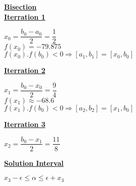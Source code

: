 \newpage
\textbf{\underline{Bisection}}\\[0.15cm]
\textbf{\underline{Iterration 1}}
\begin{center}
    \(x_0 = \dfrac{b_0-a_0}{2} = \dfrac{1}{2}\)\\[0.4cm]
    \(f(x_0) = -79.875\)\\[0.4cm]
    \(f(x_0) . f(b_0) < 0 \Rightarrow [a_1,b_1] = [x_0,b_0]\)
\end{center}

\vspace{1cm}

\textbf{\underline{Iterration 2}}
\begin{center}
    \(x_1 = \dfrac{b_0-x_0}{2} = \dfrac{9}{4}\)\\[0.4cm]
    \(f(x_1) \approx -68.6\)\\[0.4cm]
    \(f(x_1) . f(b_0) < 0 \Rightarrow [a_2,b_2] = [x_1,b_0]\)
\end{center}

\vspace{1cm}

\textbf{\underline{Iterration 3}}
\begin{center}
    \(x_2 = \dfrac{b_0-x_1}{2} = \dfrac{11}{8}\)\\[0.4cm]
\end{center}

\vspace{1cm}

\textbf{\underline{Solution Interval}}
\begin{center}
   \( \boxed{x_3 - \epsilon \leq \alpha \leq \epsilon + x_3}\)\\[0.3cm]
\end{center}

